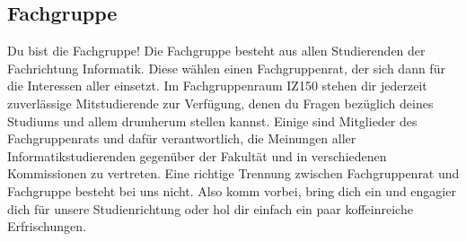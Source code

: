 
\subsection{Fachgruppe}
	\label{fachgruppe}
	Du bist die Fachgruppe! Die Fachgruppe besteht aus allen Studierenden der Fachrichtung Informatik. Diese wählen einen Fachgruppenrat, der sich dann für die Interessen aller einsetzt.
	Im Fachgruppenraum IZ150 stehen dir jederzeit zuverlässige Mitstudierende zur Verfügung, denen du Fragen bezüglich deines Studiums und allem drumherum stellen kannst. Einige sind Mitglieder des Fachgruppenrats und dafür verantwortlich, die Meinungen aller Informatikstudierenden gegenüber der Fakultät und in verschiedenen Kommissionen zu vertreten. Eine richtige Trennung zwischen Fachgruppenrat und Fachgruppe besteht bei uns nicht. Also komm vorbei, bring dich ein und engagier dich für unsere Studienrichtung oder hol dir einfach ein paar koffeinreiche Erfrischungen. 
